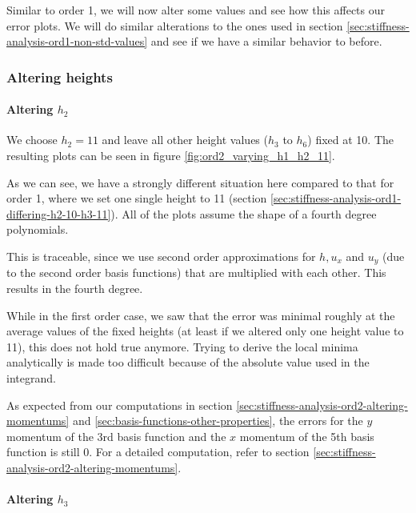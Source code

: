 \documentclass[a4paper, twoside]{article}
\begin{document}
Similar to order 1, we will now alter some values and see how this affects our error plots. We will do similar alterations to the ones used in section \ref{sec:stiffness-analysis-ord1-non-std-values} and see if we have a similar behavior to before.

\subsubsection{Altering heights}
\label{sec:stiffness-analysis-ord2-nondefault-altering-heights}

\paragraph{\texorpdfstring{Altering $h_2$}{Altering h2}}

We choose $h_2=11$ and leave all other height values ($h_3$ to $h_6$) fixed at 10. The resulting plots can be seen in figure \ref{fig:ord2_varying_h1_h2_11}.



As we can see, we have a strongly different situation here compared to that for order 1, where we set one single height to 11 (section \ref{sec:stiffness-analysis-ord1-differing-h2-10-h3-11}). All of the plots assume the shape of a fourth degree polynomials.

This is traceable, since we use second order approximations for $h, u_x$ and $u_y$ (due to the second order basis functions) that are multiplied with each other. This results in the fourth degree.

While in the first order case, we saw that the error was minimal roughly at the average values of the fixed heights (at least if we altered only one height value to 11), this does not hold true anymore. Trying to derive the local minima analytically is made too difficult because of the absolute value used in the integrand.

As expected from our computations in section \ref{sec:stiffness-analysis-ord2-altering-momentums} and \ref{sec:basis-functions-other-properties}, the errors for the $y$ momentum of the 3rd basis function and the $x$ momentum of the 5th basis function is still 0. For a detailed computation, refer to section \ref{sec:stiffness-analysis-ord2-altering-momentums}.

\paragraph{\texorpdfstring{Altering $h_3$}{Altering h3}}
\end{document}
